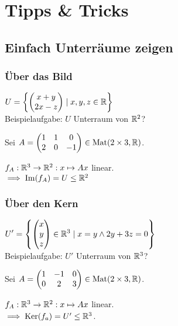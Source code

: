 \section*{Tipps \& Tricks}

\subsection*{Einfach Unterräume zeigen}

\subsubsection*{Über das Bild}
$\displaystyle U=\left\{\begin{pmatrix} x+y \\ 2x-z \end{pmatrix} \mid x,y,z\in\mathbb{R} \right\}$ \\
Beispielaufgabe: $U$ Unterraum von $\mathbb{R}^2$?

Sei $\displaystyle A=\begin{pmatrix} 1 & 1 & 0 \\ 2 & 0 & -1 \end{pmatrix} \in\operatorname{Mat}(2 \times 3, \mathbb{R})$.

$f_A: \mathbb{R}^3 \to \mathbb{R}^2: x \mapsto Ax$ linear. \\
$\implies \operatorname{Im}(f_A)=U \le \mathbb{R}^2$

\subsubsection*{Über den Kern}
$\displaystyle U'=\left\{\begin{pmatrix} x\\y\\z \end{pmatrix}\in\mathbb{R}^3 \mid x=y \land 2y+3z=0\right\}$ \\
Beispielaufgabe: $U'$ Unterraum von $\mathbb{R}^3$?

Sei $\displaystyle A=\begin{pmatrix} 1 & -1 & 0 \\ 0 & 2 & 3 \end{pmatrix} \in\operatorname{Mat}(2\times3, \mathbb{R})$.

$f_A: \mathbb{R}^3 \to \mathbb{R}^2: x\mapsto Ax$ linear. \\
$\implies \operatorname{Ker}(f_a)=U' \le \mathbb{R}^3$.

